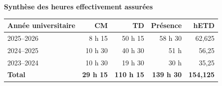 \vspace{.65\baselineskip}
\begin{center}
  {\color{EnsBlack}\bfseries Synthèse des heures effectivement assurées}\par
  \vspace{.45\baselineskip}
  \renewcommand{\arraystretch}{1.28}%
  \setlength{\tabcolsep}{9pt}%
  \begin{tabular}{@{}lrrrr@{}}
    \toprule
    \rowcolor{EnsPale}
    \textbf{Année universitaire}
      & \textbf{CM}
      & \textbf{TD}
      & \textbf{Présence}
      & \textbf{hETD} \\
    \midrule
    2025--2026 & 8 h 15  & 50 h 15 & 58 h 30  & 62{,}625 \\
    2024--2025 & 10 h 30 & 40 h 30 & 51 h     & 56{,}25  \\
    2023--2024 & 10 h 30 & 19 h 30 & 30 h     & 35{,}25  \\
    \midrule
    \textbf{Total} & \textbf{29 h 15} & \textbf{110 h 15}
      & \textbf{139 h 30} & \textbf{154{,}125} \\
    \bottomrule
  \end{tabular}
  \par\vspace{.45\baselineskip}
  \parbox{.88\textwidth}{%
    \footnotesize\color{EnsDark}
  }
\end{center}

\clearpage

\vspace{.45\baselineskip}
\small
\setlength{\LTpre}{0pt}
\setlength{\LTpost}{0pt}
\setlength{\tabcolsep}{0pt}
\renewcommand{\arraystretch}{1.04}

